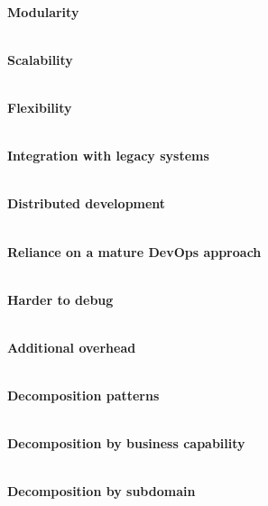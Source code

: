 


\hspace*{\fill} \\ %
\noindent
\textbf{Modularity}

\hspace*{\fill} \\ %
\noindent
\textbf{Scalability}

\hspace*{\fill} \\ %
\noindent
\textbf{Flexibility}

\hspace*{\fill} \\ %
\noindent
\textbf{Integration with legacy systems}

\hspace*{\fill} \\ %
\noindent
\textbf{Distributed development}


\hspace*{\fill} \\ %
\noindent
\textbf{Reliance on a mature DevOps approach}

\hspace*{\fill} \\ %
\noindent
\textbf{Harder to debug}

\hspace*{\fill} \\ %
\noindent
\textbf{Additional overhead}


\hspace*{\fill} \\ %
\noindent
\textbf{Decomposition patterns}

\hspace*{\fill} \\ %
\noindent
\textbf{Decomposition by business capability}

\hspace*{\fill} \\ %
\noindent
\textbf{Decomposition by subdomain}

